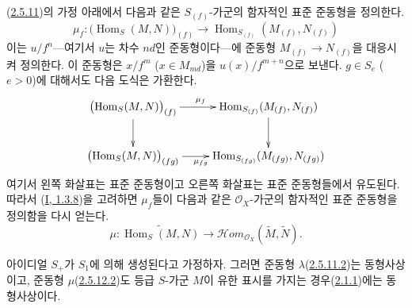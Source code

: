 \begin{env}[2.5.12]
\label{II.2.5.12-ko}
(\hyperref[II.2.5.11-ko]{2.5.11})의 가정 아래에서 다음과 같은
$S_{(f)}$-가군의 함자적인 표준 준동형을 정의한다.
\[
\label{II.2.5.12.1-ko}
  \mu_f:\bigl(\operatorname{Hom}_S(M,N)\bigr)_{(f)}
  \longrightarrow
  \operatorname{Hom}_{S_{(f)}}(M_{(f)},N_{(f)})
\tag{2.5.12.1}
\]
이는 $u/f^n$---여기서 $u$는 차수 $nd$인 준동형이다---에 준동형
$M_{(f)}\to N_{(f)}$을 대응시켜 정의한다. 이 준동형은 $x/f^m$
($x\in M_{md}$)을 $u(x)/f^{m+n}$으로 보낸다. $g\in S_e$ ($e>0$)에
대해서도 다음 도식은 가환한다.
\[
  \xymatrix{
    \bigl(\operatorname{Hom}_S(M,N)\bigr)_{(f)}
    \ar[r]^{\mu_f}\ar[d]
    & \operatorname{Hom}_{S_{(f)}}(M_{(f)},N_{(f)})\ar[d]\\
    \bigl(\operatorname{Hom}_S(M,N)\bigr)_{(fg)}
    \ar[r]_{\mu_{fg}}
    & \operatorname{Hom}_{S_{(fg)}}(M_{(fg)},N_{(fg)})
  }
\]
여기서 왼쪽 화살표는 표준 준동형이고 오른쪽 화살표는 표준 준동형들에서
유도된다. 따라서 (\hyperref[I.1.3.8-ko]{I, 1.3.8})을 고려하면
$\mu_f$들이 다음과 같은 $\mathcal{O}_X$-가군의 함자적인 표준 준동형을
정의함을 다시 얻는다.
\[
\label{II.2.5.12.2-ko}
  \mu:\widetilde{\operatorname{Hom}_S(M,N)}
  \longrightarrow
  \mathcal{H}om_{\mathcal{O}_X}(\widetilde{M},\widetilde{N}).
\tag{2.5.12.2}
\]
\end{env}

\begin{proposition}[2.5.13]
\label{II.2.5.13-ko}
아이디얼 $S_+$가 $S_1$에 의해 생성된다고 가정하자. 그러면 준동형
$\lambda$(\hyperref[II.2.5.11.2-ko]{2.5.11.2})는 동형사상이고, 준동형
$\mu$(\hyperref[II.2.5.12.2-ko]{2.5.12.2})도 등급 $S$-가군 $M$이
유한 표시를 가지는 경우(\hyperref[II.2.1.1-ko]{2.1.1})에는 동형사상이다.
\end{proposition}

